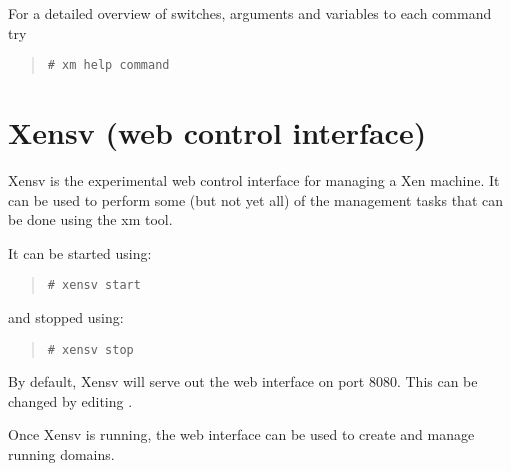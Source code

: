 For a detailed overview of switches, arguments and variables to each
command try
\begin{quote}
\begin{verbatim}
# xm help command
\end{verbatim}
\end{quote}

\section{Xensv (web control interface)}
\label{s:xensv}

Xensv is the experimental web control interface for managing a Xen
machine.  It can be used to perform some (but not yet all) of the
management tasks that can be done using the xm tool.

It can be started using:
\begin{quote}
  \verb_# xensv start_
\end{quote}
and stopped using:
\begin{quote}
  \verb_# xensv stop_
\end{quote}

By default, Xensv will serve out the web interface on port 8080.  This
can be changed by editing
.

Once Xensv is running, the web interface can be used to create and
manage running domains.
